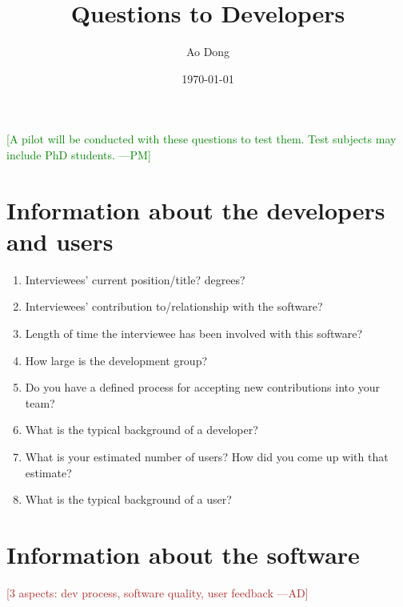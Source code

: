 \documentclass[12pt]{article}
\title{Questions to Developers}
\author{Ao Dong}
\date{\today}
\newcommand{\authornote}[3]{\textcolor{#1}{[#3 ---#2]}}
\newcommand{\authornote}[3]{}
\newcommand{\pmi}[1]{\authornote{green}{PM}{#1}} %
\newcommand{\ad}[1]{\authornote{brown}{AD}{#1}} %
\begin{document}
\maketitle
\pmi{A pilot will be conducted with these questions to test them. Test subjects may include PhD students.}
\section{Information about the developers and users}\citep{Jegatheesan2016}
\begin{enumerate}
\item Interviewees' current position/title? degrees?
\item Interviewees' contribution to/relationship with the software?
\item Length of time the interviewee has been involved with this software?
\item How large is the development group?
\item Do you have a defined process for accepting new contributions into your team?
\item What is the typical background of a developer?
\item What is your estimated number of users? How did you come up with that estimate?
\item What is the typical background of a user?
\end{enumerate}

\section{Information about the software}

\noindent\ad{3 aspects: dev process, software quality, user feedback}
\end{document}
